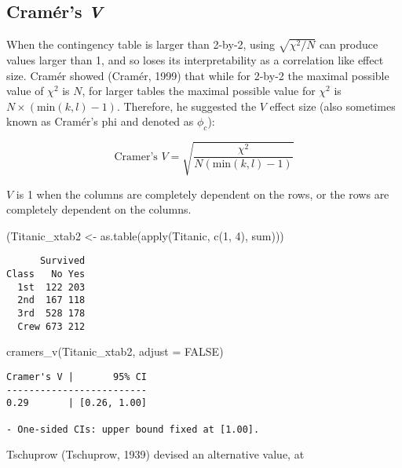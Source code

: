 \documentclass[
]{article}
\newenvironment{Shaded}{\begin{snugshade}}{\end{snugshade}}
\newcommand{\AttributeTok}[1]{\textcolor[rgb]{0.77,0.63,0.00}{#1}}
\newcommand{\ConstantTok}[1]{\textcolor[rgb]{0.00,0.00,0.00}{#1}}
\newcommand{\DecValTok}[1]{\textcolor[rgb]{0.00,0.00,0.81}{#1}}
\newcommand{\FunctionTok}[1]{\textcolor[rgb]{0.00,0.00,0.00}{#1}}
\newcommand{\NormalTok}[1]{#1}
\newcommand{\OtherTok}[1]{\textcolor[rgb]{0.56,0.35,0.01}{#1}}
\begin{document}
\hypertarget{cramuxe9rs-v}{%
\subsection{\texorpdfstring{Cramér's
\emph{V}}{Cramér's V}}\label{cramuxe9rs-v}}

When the contingency table is larger than 2-by-2, using
\(\sqrt{\chi^2/N}\) can produce values larger than 1, and so loses its
interpretability as a correlation like effect size. Cramér showed
(Cramér, 1999) that while for 2-by-2 the maximal possible value of
\(\chi^2\) is \(N\), for larger tables the maximal possible value for
\(\chi^2\) is \(N\times (\text{min}(k,l)-1)\). Therefore, he suggested
the \(V\) effect size (also sometimes known as Cramér's phi and denoted
as \(\phi_{c}\)):

\[
\text{Cramer's } V = \sqrt{\frac{\chi^2}{N(\text{min}(k,l)-1)}}
\]

\(V\) is 1 when the columns are completely dependent on the rows, or the
rows are completely dependent on the columns.

\begin{Shaded}
\begin{Highlighting}[]
\NormalTok{(Titanic\_xtab2 }\OtherTok{\textless{}{-}} \FunctionTok{as.table}\NormalTok{(}\FunctionTok{apply}\NormalTok{(Titanic, }\FunctionTok{c}\NormalTok{(}\DecValTok{1}\NormalTok{, }\DecValTok{4}\NormalTok{), sum)))}
\end{Highlighting}
\end{Shaded}

\begin{verbatim}
      Survived
Class   No Yes
  1st  122 203
  2nd  167 118
  3rd  528 178
  Crew 673 212
\end{verbatim}

\begin{Shaded}
\begin{Highlighting}[]
\FunctionTok{cramers\_v}\NormalTok{(Titanic\_xtab2, }\AttributeTok{adjust =} \ConstantTok{FALSE}\NormalTok{)}
\end{Highlighting}
\end{Shaded}

\begin{verbatim}
Cramer's V |       95% CI
-------------------------
0.29       | [0.26, 1.00]

- One-sided CIs: upper bound fixed at [1.00].
\end{verbatim}

Tschuprow (Tschuprow, 1939) devised an alternative value, at
\end{document}
